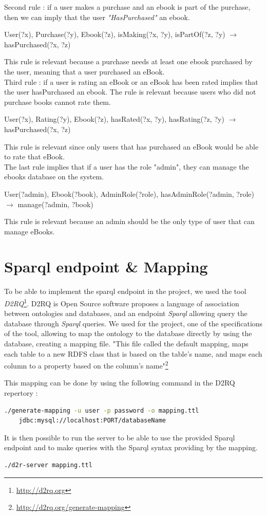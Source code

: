 \documentclass[a4paper,12pt]{article}
\begin{document}
Second rule : if a user makes a purchase and an ebook is part of the purchase, then we can imply that
the user \textit{"HasPurchased"} an ebook. 

User(?x), Purchase(?y), Ebook(?z), isMaking(?x, ?y), isPartOf(?z, ?y) $\rightarrow$ hasPurchased(?x, ?z)

This rule is relevant because a purchase needs at least one ebook purchased by the user, meaning
that a user purchased an eBook.\\

Third rule : if a user is rating an eBook or an eBook has been rated implies that the user hasPurchased an ebook.
The rule is relevant because users who did not purchase books cannot rate them.

User(?x), Rating(?y), Ebook(?z), hasRated(?x, ?y), hasRating(?z, ?y) $\rightarrow$ hasPurchased(?x, ?z)

This rule is relevant since only users that has purchased an eBook would be able to rate that eBook.\\

The last rule implies that if a user has the role "admin", they can manage the ebooks database on the system.

User(?admin), Ebook(?book), AdminRole(?role), hasAdminRole(?admin, ?role) $\rightarrow$ manage(?admin, ?book)

This rule is relevant because an admin should be the only type of user that can manage eBooks.

\section{Sparql endpoint \& Mapping}
To be able to implement the sparql endpoint in the project, we used the tool \textit{D2RQ}\footnote{\url{http://d2rq.org}}. D2RQ is Open Source software proposes a language of association between ontologies and databases, and an endpoint \textit{Sparql} allowing query the database through \textit{Sparql} queries. We used for the project, one of the specifications of the tool, allowing to map the ontology to the database directly by using the database, creating a mapping file. "This file called the default mapping, maps each table to a new RDFS class that is based on the table's name, and maps each column to a property based on the column's name"\footnote{\url{http://d2rq.org/generate-mapping}}

This mapping can be done by using the following command in the D2RQ repertory :

\begin{lstlisting}[language=bash]
./generate-mapping -u user -p password -o mapping.ttl 
	jdbc:mysql://localhost:PORT/databaseName
\end{lstlisting}

It is then possible to run the server to be able to use the provided Sparql endpoint and to make queries with the Sparql syntax providing by the mapping.

\begin{lstlisting}
./d2r-server mapping.ttl
\end{lstlisting}
\end{document}
